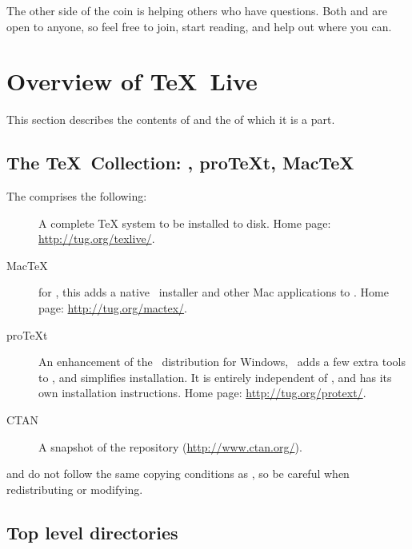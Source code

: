 \documentclass{article}
\begin{document}
The other side of the coin is helping others who have questions.  Both
 and  are open to anyone, so feel
free to join, start reading, and help out where you can.


\section{Overview of \protect\TeX\protect\ Live}
\label{sec:overview-tl}

This section describes the contents of \TL{} and the \TK{} of which it
is a part.

\subsection{The \protect\TeX\protect\ Collection: \TL, pro\TeX{}t, Mac\TeX}
\label{sec:tl-coll-dists}

The \TK{} \DVD{} comprises the following:

\begin{description}

\item [\TL] A complete \TeX{} system to be installed to disk.  Home
page: \url{http://tug.org/texlive/}.

\item [Mac\TeX] for \MacOSX, this adds a native \MacOSX\ installer and other
Mac applications to \TL{}.  Home page:
\url{http://tug.org/mactex/}.

\item [pro\TeX{}t] An enhancement of the \MIKTEX\ distribution for Windows,
\ProTeXt\ adds a few extra tools to \MIKTEX, and simplifies
installation.  It is entirely independent of \TL{}, and has its own
installation instructions.  Home page:
\url{http://tug.org/protext/}.

\item [CTAN] A snapshot of the \CTAN{} repository (\url{http://www.ctan.org/}).

\end{description}

\CTAN{} and  do not follow the same copying conditions
as \TL{}, so be careful when redistributing or modifying.


\subsection{Top level \TL{} directories}
\label{sec:tld}
\end{document}
